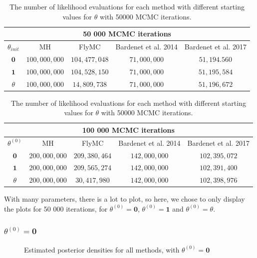  \begin{table}
    \centering
\begin{tabular}{|c|c|c|c|c|}
  \hline
    \multicolumn{5}{|c|}{50 000 MCMC iterations} \\
    \hline
\hline
        $\theta_{init}$ &  MH & FlyMC & Bardenet et al. 2014 & Bardenet et al. 2017\\ 
         \hline \hline$\mathbf{0}$ & $100,000,000$ & $104,477,048$ & $71,000,000$ & $51,194.560$ \\
        $\mathbf{1}$ & $100,000,000$ & $104,528,150$ & $71,000,000$ & $51,195,584$ \\
        $\theta$ & $100,000,000$ & $14,809,738$ & $71,000,000$ & $51,196,672$
        \\ \hline
\end{tabular}
\caption{The number of likelihood evaluations for each method with different starting values for $\theta$ with 50000 MCMC iterations.}
\label{tab:multiple_evals_50k}
\end{table} 

 \begin{table}
    \centering
\begin{tabular}{|c|c|c|c|c|}
  \hline
    \multicolumn{5}{|c|}{100 000 MCMC iterations} \\
    \hline
\hline
        $\theta^{\left(0\right)}$ &  MH & FlyMC & Bardenet et al. 2014 & Bardenet et al. 2017\\ 
         \hline \hline$\mathbf{0}$ & $200,000,000$ & $209,380,464$ & $142,000,000$ & $102,395,072$ \\
        $\mathbf{1}$ & $200,000,000$ & $209,565,274$ & $142,000,000$ & $102,391,400$ \\
        $\theta$ & $200,000,000$ & $30,417,980$ & $142,000,000$ & $102,398,976$
        \\ \hline
\end{tabular}
\caption{The number of likelihood evaluations for each method with different starting values for $\theta$ with 50000 MCMC iterations.}
\label{tab:multiple_evals_100k}
\end{table} 
With many parameters, there is a lot to plot, so here, we chose to only display the plots for 50 000 iterations, for  $\theta^{\left(0\right)} = \mathbf{0}$, $\theta^{\left(0\right)} = \mathbf{1}$ and $\theta^{\left(0\right)} = \theta$.   

\subsubsection{$\theta^{\left(0\right)} = \mathbf{0}$}
\begin{figure}%
    \centering
    \qquad
    \caption{Estimated posterior densities for all methods, with $\theta^{\left(0\right)} = \mathbf{0}$}%
    \label{fig:density_50k_02_06}%
\end{figure}


